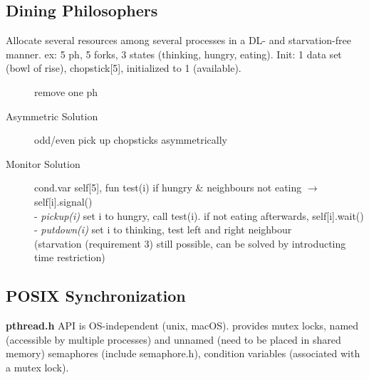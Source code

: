 \subsection*{Dining Philosophers}
Allocate several resources among several processes in a DL- and starvation-free manner. ex: 5 ph, 5 forks, 3 states (thinking, hungry, eating). Init: 1 data set (bowl of rise), chopstick[5], initialized to 1 (available).
\begin{description}
    \item[]remove one ph %
    \item[Asymmetric Solution] odd/even pick up chopsticks asymmetrically
    \item[Monitor Solution]cond.var self[5], fun test(i) if hungry \& neighbours not eating $\rightarrow$ self[i].signal() \\
        - \textit{pickup(i)} set i to hungry, call test(i). if not eating afterwards, self[i].wait() \\
        - \textit{putdown(i)} set i to thinking, test left and right neighbour \\
        (starvation (requirement 3) still possible, can be solved by introducting time restriction)
\end{description}
\subsection*{POSIX Synchronization}
    \textbf{pthread.h} API is OS-independent (unix, macOS). provides mutex locks, named (accessible by multiple processes) and unnamed (need to be placed in shared memory) semaphores (include semaphore.h), condition variables (associated with a mutex lock).
